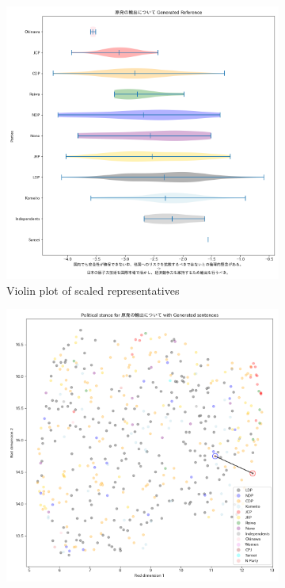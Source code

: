 \documentclass[final,5p,times,twocolumn,authoryear]{elsarticle}
\begin{document}
\begin{figure}[h]
\centering
    \begin{subfigure}{0.22\textwidth}
      \centering
      \includegraphics[width=1\linewidth]{figs/results/nuclear/原発の輸出について_gen_violin_plot.png}
      \caption{Violin plot of scaled representatives}
    \end{subfigure}
    \begin{subfigure}{0.22\textwidth}
      \centering
      \includegraphics[width=1\linewidth]{figs/results/nuclear/原発の輸出について_umap_gen.png}

\end{subfigure}
\end{figure}
\end{document}
